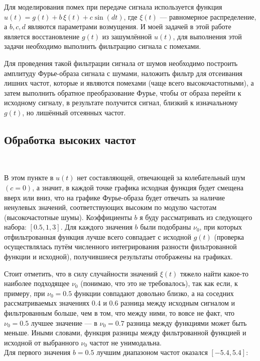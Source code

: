 \documentclass[a4paper]{article}
\begin{document}
Для моделирования помех при передаче сигнала используется функция $u(t) = g(t) + b\,\xi(t) + c \sin{(dt)}$, где $\xi(t)$ --- равномерное распределение, а $b,c,d$ являются параметрами возмущения. И моей задачей в этой работе является восстановление $g(t)$ из зашумлённой $u(t)$, для выполнения этой задачи необходимо выполнить фильтрацию сигнала с помехами.\ 

Для проведения такой фильтрации сигнала от шумов необходимо построить амплитуду Фурье-образа сигнала с шумами, наложить фильтр для отсеивания лишних частот, которые и являются помехами (чаще всего высокочастотными), а затем выполнить обратное преобразование Фурье, чтобы от образа перейти к исходному сигналу, в результате получится сигнал, близкий к изначальному $g(t)$, но лишённый отсеянных частот.

\subsection{Обработка высоких частот}\

В этом пункте в $u(t)$ нет составляющей, отвечающей за колебательный шум $(c = 0)$, а значит, в каждой точке графика исходная функция будет смещена вверх или вниз, что на графике Фурье-образа будет отвечать за наличие ненулевых значений, соответствующих высоким по модулю частотам (высокочастотные шумы). Коэффициенты $b$ я буду рассматривать из следующего набора: $[0.5, 1, 3]$. Для каждого значения $b$ были подобраны $\nu_0$, при которых отфильтрованная функция лучше всего совпадает с исходной $g(t)$ (проверка осуществлялась путём численного интегрирования разности фильтрованной функции и исходной), получившиеся результаты отображены на графиках.\

Стоит отметить, что в силу случайности значений $\xi(t)$ тяжело найти какое-то наиболее подходящее $\nu_0$ (понимаю, что это не требовалось), так как если, к примеру, при $\nu_0=0.5$ функции совпадают довольно близко, а на соседних рассматриваемых значениях $0.4$ и $0.6$ разница между исходным сигналом и фильтрованным больше, чем в том, что между ними, то вовсе не факт, что $\nu_0=0.5$ лучшее значение --- в $\nu_0=0.7$ разница между функциями может быть меньше. Иными словами, функция разницы между фильтрованной функцией и исходной от выбранного $\nu_0$ частот не унимодальна.\\

Для первого значения $b=0.5$ лучшим диапазоном частот оказался $[-5.4, 5.4]$:
\end{document}
